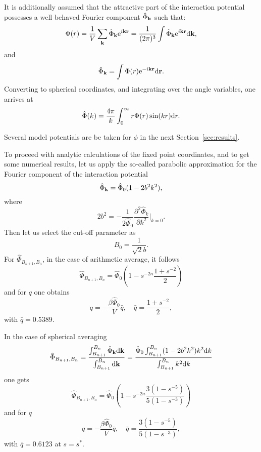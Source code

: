 It is additionally assumed that the attractive part of the interaction potential possesses a well behaved Fourier component $\hat{\Phi}_{\vb k}$ such that:
\begin{equation*}
	\Phi(r) = \frac{1}{V} \sum_{\vb k} \hat{\Phi}_{\vb k} {\rm e}^{i\vb k \vb r} = \frac{1}{(2\pi)^3} \int \hat{\Phi}_{\vb k} {\rm e}^{i\vb k \vb r} {\rm d} {\vb k},
\end{equation*}
and
\begin{equation}
	\label{def:fourier}
	\hat{\Phi}_{\vb k} = \int \Phi(r) {\rm e}^{-i\vb k \vb r} {\rm d} {\vb r}.
\end{equation}
Converting to spherical coordinates, and integrating over the angle variables, one arrives at
\begin{equation}
	\label{def:fourier_spherical}
	\hat{\Phi}(k) = \frac{4\pi}{k} \int_{0}^{\infty} r \Phi(r) \sin(k r) {\rm d} r.
\end{equation}

Several model potentials are be taken for $\phi$ in the next Section~\ref{sec:results}. 

To proceed with analytic calculations of the fixed point coordinates, and to get some numerical results, let us apply the so-called parabolic approximation for the Fourier component of the interaction potential
\begin{equation*}
	\hat{\Phi}_{\vb k} = \hat{\Phi}_0 (1 - 2b^2k^2),
\end{equation*}
where 
\begin{equation*}
	2b^2 = -\frac{1}{2\hat{\Phi}_0} \frac{\partial^2 \hat{\Phi}_k}{\partial k^2} \bigg|_{k=0}.
\end{equation*}
Then let us select the cut-off parameter as
$$
B_0 = \frac{1}{\sqrt{2} b}.
$$
For $\hat{\Phi}_{B_{n+1}, B_n}$, in the case of arithmetic average, it follows
\begin{equation*}
	\hat{\Phi}_{B_{n+1}, B_n} = \hat{\Phi}_0 \left(1 - s^{-2n} \frac{1 + s^{-2}}{2}\right)
\end{equation*}
and for $q$ one obtains
\begin{equation*}
	q = -\frac{\beta \hat{\Phi}_0}{V} \bar{q}, \quad \bar{q} = \frac{1 + s^{-2}}{2},
\end{equation*}
with $\bar{q} = 0.5389$.

In the case of spherical averaging
\begin{equation*}
	\label{def:spheric_average}
	\hat{\Phi}_{B_{n+1}, B_n} = \frac{\int_{B_{n+1}}^{B_n} \hat{\Phi}_{\vb k} {\rm d} {\vb k}}
	{\int_{B_{n+1}}^{B_n} {\rm d} {\vb k}} 
	= \frac{\hat{\Phi}_0 \int_{B_{n+1}}^{B_n} (1 - 2b^2k^2) k^2 {\rm d} k}{\int_{B_{n+1}}^{B_n} k^2 {\rm d} k}
\end{equation*}
one gets
\begin{equation*}
	\hat{\Phi}_{B_{n+1}, B_n} = \hat{\Phi}_0 \left(1 - s^{-2n} \frac{3(1 - s^{-5})}{5(1 - s^{-3})}\right)
\end{equation*}
and for $q$
\begin{equation*}
	q = -\frac{\beta \hat{\Phi}_0}{V} \bar{q}, \quad \bar{q} = \frac{3(1 - s^{-5})}{5(1 - s^{-3})},
\end{equation*}
with $\bar{q} = 0.6123$ at $s = s^*$.

